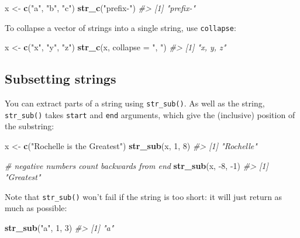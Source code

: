 \documentclass[]{book}
\newenvironment{Shaded}{\begin{snugshade}}{\end{snugshade}}
\newcommand{\CommentTok}[1]{\textcolor[rgb]{0.56,0.35,0.01}{\textit{#1}}}
\newcommand{\DataTypeTok}[1]{\textcolor[rgb]{0.13,0.29,0.53}{#1}}
\newcommand{\DecValTok}[1]{\textcolor[rgb]{0.00,0.00,0.81}{#1}}
\newcommand{\KeywordTok}[1]{\textcolor[rgb]{0.13,0.29,0.53}{\textbf{#1}}}
\newcommand{\NormalTok}[1]{#1}
\newcommand{\StringTok}[1]{\textcolor[rgb]{0.31,0.60,0.02}{#1}}
\begin{document}
\begin{Shaded}
\begin{Highlighting}[]
\NormalTok{x <-}\StringTok{ }\KeywordTok{c}\NormalTok{(}\StringTok{"a"}\NormalTok{, }\StringTok{"b"}\NormalTok{, }\StringTok{"c"}\NormalTok{)}
\KeywordTok{str_c}\NormalTok{(}\StringTok{"prefix-"}\NormalTok{)}
\CommentTok{#> [1] "prefix-"}
\end{Highlighting}
\end{Shaded}

To collapse a vector of strings into a single string, use \texttt{collapse}:

\begin{Shaded}
\begin{Highlighting}[]
\NormalTok{x <-}\StringTok{ }\KeywordTok{c}\NormalTok{(}\StringTok{"x"}\NormalTok{, }\StringTok{"y"}\NormalTok{, }\StringTok{"z"}\NormalTok{)}
\KeywordTok{str_c}\NormalTok{(x, }\DataTypeTok{collapse =} \StringTok{", "}\NormalTok{)}
\CommentTok{#> [1] "x, y, z"}
\end{Highlighting}
\end{Shaded}

\hypertarget{subsetting-strings}{%
\subsection{Subsetting strings}\label{subsetting-strings}}

You can extract parts of a string using \texttt{str\_sub()}. As well as the string, \texttt{str\_sub()} takes \texttt{start} and \texttt{end} arguments, which give the (inclusive) position of the substring:

\begin{Shaded}
\begin{Highlighting}[]
\NormalTok{x <-}\StringTok{ }\KeywordTok{c}\NormalTok{(}\StringTok{"Rochelle is the Greatest"}\NormalTok{)}
\KeywordTok{str_sub}\NormalTok{(x, }\DecValTok{1}\NormalTok{, }\DecValTok{8}\NormalTok{)}
\CommentTok{#> [1] "Rochelle"}

\CommentTok{# negative numbers count backwards from end}
\KeywordTok{str_sub}\NormalTok{(x, }\DecValTok{-8}\NormalTok{, }\DecValTok{-1}\NormalTok{)}
\CommentTok{#> [1] "Greatest"}
\end{Highlighting}
\end{Shaded}

Note that \texttt{str\_sub()} won't fail if the string is too short: it will just return as much as possible:

\begin{Shaded}
\begin{Highlighting}[]
\KeywordTok{str_sub}\NormalTok{(}\StringTok{"a"}\NormalTok{, }\DecValTok{1}\NormalTok{, }\DecValTok{3}\NormalTok{)}
\CommentTok{#> [1] "a"}
\end{Highlighting}
\end{Shaded}
\end{document}
